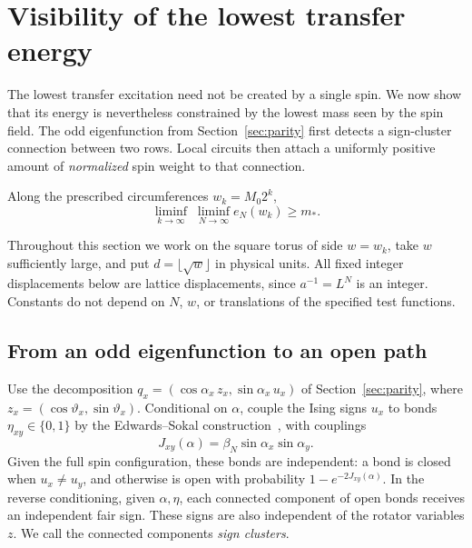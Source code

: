 \section{Visibility of the lowest transfer energy}
\label{sec:visibility}

The lowest transfer excitation need not be created by a single spin.
We now show that its energy is nevertheless constrained by the lowest
mass seen by the spin field.  The odd eigenfunction from
Section~\ref{sec:parity} first detects a sign-cluster connection between
two rows.  Local circuits then attach a uniformly positive amount of
\emph{normalized} spin weight to that connection.

\begin{proposition}\label{vis:proposition}
Along the prescribed circumferences $w_k=M_0 2^k$,
\begin{equation}\label{vis:gap}
 \liminf_{k\to\infty}\;\liminf_{N\to\infty} e_N(w_k)\ge m_*.
\end{equation}
\end{proposition}

Throughout this section we work on the square torus of side $w=w_k$,
take $w$ sufficiently large, and put $d=\lfloor\sqrt w\rfloor$ in physical
units.  All fixed integer displacements below are lattice displacements,
since $a^{-1}=L^N$ is an integer.  Constants do not depend on $N$, $w$,
or translations of the specified test functions.

\subsection{From an odd eigenfunction to an open path}

Use the decomposition $q_x=(\cos\alpha_x\,z_x,\sin\alpha_x\,u_x)$
of Section~\ref{sec:parity}, where
$z_x=(\cos\vartheta_x,\sin\vartheta_x)$.  Conditional on $\alpha$, couple the Ising
signs $u_x$ to bonds $\eta_{xy}\in\{0,1\}$ by the Edwards--Sokal
construction~\cite{EdwardsSokal1988}, with couplings
\[
 J_{xy}(\alpha)=\beta_N\sin\alpha_x\sin\alpha_y.
\]
Given the full spin configuration, these bonds are independent: a bond
is closed when $u_x\ne u_y$, and otherwise is open with probability
$1-e^{-2J_{xy}(\alpha)}$.  In the reverse conditioning, given
$\alpha,\eta$, each connected component of open bonds receives an
independent fair sign.  These signs are also independent of the rotator
variables $z$.  We call the connected components \emph{sign clusters}.

